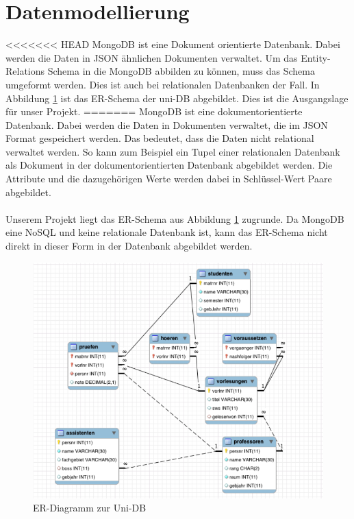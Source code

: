 \section{Datenmodellierung}
\label{kap:ERDiagramm}
<<<<<<< HEAD
MongoDB ist eine Dokument orientierte Datenbank. Dabei werden die Daten in JSON
ähnlichen Dokumenten verwaltet. Um das Entity-Relations Schema in die MongoDB
abbilden zu können, muss das Schema umgeformt werden. Dies ist auch bei
relationalen Datenbanken der Fall. In Abbildung \ref{fig:uni-db} ist das
ER-Schema der uni-DB abgebildet. Dies ist die Ausgangslage für unser Projekt.
=======
MongoDB ist eine dokumentorientierte Datenbank. Dabei werden die Daten in Dokumenten verwaltet, die im JSON Format gespeichert werden. Das bedeutet, dass die Daten nicht relational
verwaltet werden. So kann zum Beispiel ein Tupel einer relationalen Datenbank
als Dokument in der dokumentorientierten Datenbank abgebildet werden. Die
Attribute und die dazugehörigen Werte werden dabei in Schlüssel-Wert Paare
abgebildet. 
\\\\
Unserem Projekt liegt das ER-Schema aus Abbildung \ref{fig:uni-db}
zugrunde.
Da MongoDB eine NoSQL und keine relationale Datenbank ist, kann das ER-Schema nicht direkt
in dieser Form in der Datenbank abgebildet werden. 

\begin{figure}[h] 
	\centering
		\includegraphics[width=1\textwidth]{./pictures/SQL-DB_ER_Diagramm_UNI-DB.png}
	\caption{ER-Diagramm zur Uni-DB \cite{Kaufmann2016}}
	\label{fig:uni-db}
\end{figure}

